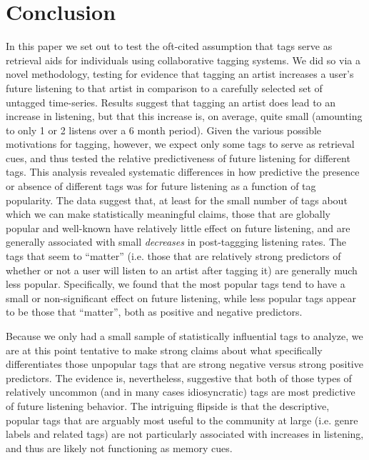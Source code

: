 \section{Conclusion}
\label{sec_conclusion}

In this paper we set out to test the oft-cited assumption that tags serve as retrieval aids for individuals using collaborative tagging systems.  We did so via a novel methodology, testing for evidence that tagging an artist increases a user's future listening to that artist in comparison to a carefully selected set of untagged time-series. Results suggest that tagging an artist does lead to an increase in listening, but that this increase is, on average, quite small (amounting to only 1 or 2 listens over a 6 month period). Given the various possible motivations for tagging, however, we expect only some tags to serve as retrieval cues, and thus tested the relative predictiveness of future listening for different tags. This analysis revealed systematic differences in how predictive the presence or absence of different tags was for future listening as a function of tag popularity. The data suggest that, at least for the small number of tags about which we can make statistically meaningful claims, those that are globally popular and well-known have relatively little effect on future listening, and are generally associated with small \emph{decreases} in post-taggging listening rates. The tags that seem to ``matter'' (i.e. those that are relatively strong predictors of whether or not a user will listen to an artist after tagging it) are generally much less popular. Specifically, we found that the most popular tags tend to have a small or non-significant effect on future listening, while less popular tags appear to be those that ``matter'', both as positive and negative predictors.

Because we only had a small sample of statistically influential tags to analyze, we are at this point tentative to make strong claims about what specifically differentiates those unpopular tags that are strong negative versus strong positive predictors. The evidence is, nevertheless, suggestive that both of those types of relatively uncommon (and in many cases idiosyncratic) tags are most predictive of future listening behavior. The intriguing flipside is that the descriptive, popular tags that are arguably most useful to the community at large (i.e. genre labels and related tags) are not particularly associated with increases in listening, and thus are likely not functioning as memory cues.

